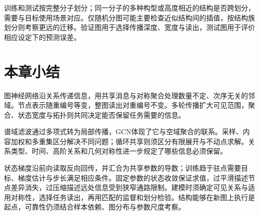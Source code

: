 训练和测试按完整分子划分；同一分子的多种构型或高度相近的结构是否跨划分，需要与目标使用场景对应。仅随机分图可能主要检查近似结构间的插值，按结构族划分则考察更远的迁移。验证图用于选择传播深度、宽度与读出，测试图用于评价相应设定下的预测误差。

\section{本章小结}
\label{sec:gnn-summary}

图神经网络沿关系传递信息，用共享消息与对称聚合处理数量不定、次序无关的邻域。节点表示随重编号等变，整图读出对重编号不变。多轮传播扩大可见范围，聚合、状态宽度与拓扑则共同决定能否保留任务需要的信息。

谱域滤波通过多项式转为局部传播，GCN体现了它与空域聚合的联系。采样、内容加权和多重集区分解决不同问题；循环共享则须区分有限展开与不动点求解。关系类型、时间、高阶关系和几何对称性进一步规定了哪些信息必须保留。

状态梯度沿前向读取反向回传，并汇合为共享参数的导数；训练趋于驻点需要目标、梯度估计与步长满足相应条件。固定参数的状态收敛保证求值，过平滑描述节点差异消失，过压缩描述远处信息受到狭窄通路限制。建模时须确定可见关系与适用对称性，选择任务读出，再用匹配的监督和划分检验。结构能够在新图上执行是起点，可靠性仍须结合样本依赖、图分布与参数尺度考察。
